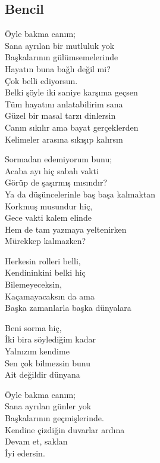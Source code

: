 \subsection{Bencil}

Öyle bakma canım; \\
Sana ayrılan bir mutluluk yok \\
Başkalarının gülümsemelerinde \\
Hayatın buna bağlı değil mi? \\
Çok belli ediyorsun. \\

\noindent\newline
Belki şöyle iki saniye karşıma geçsen \\
Tüm hayatını anlatabilirim sana \\
Güzel bir masal tarzı dinlersin \\
Canın sıkılır ama bayat gerçeklerden \\
Kelimeler arasına sıkışıp kalırsın

\noindent\newline
Sormadan edemiyorum bunu; \\
Acaba ayı hiç sabah vakti \\
Görüp de şaşırmış mısındır? \\
Ya da düşüncelerinle baş başa kalmaktan \\
Korkmuş musundur hiç, \\
Gece vakti kalem elinde \\
Hem de tam yazmaya yeltenirken \\
Mürekkep kalmazken?

\noindent\newline
Herkesin rolleri belli, \\
Kendininkini belki hiç \\
Bilemeyeceksin, \\
Kaçamayacaksın da ama \\
Başka zamanlarla başka dünyalara

\noindent\newline
Beni sorma hiç, \\
İki bira söylediğim kadar \\
Yalnızım kendime \\
Sen çok bilmezsin bunu \\
Ait değildir dünyana

\noindent\newline
Öyle bakma canım; \\
Sana ayrılan günler yok \\
Başkalarının geçmişlerinde. \\
Kendine çizdiğin duvarlar ardına \\
Devam et, saklan \\
İyi edersin.